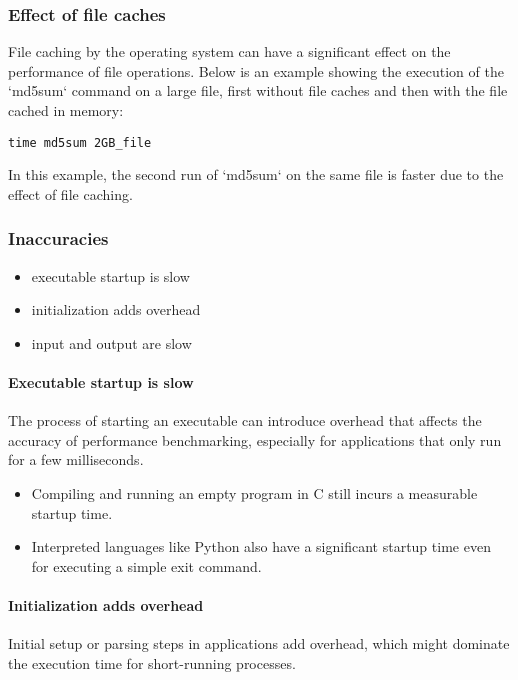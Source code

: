 \documentclass[12pt]{article}
\begin{document}
\subsubsection{Effect of file caches}
File caching by the operating system can have a significant effect on the performance of file operations. Below is an example showing the execution of the `md5sum` command on a large file, first without file caches and then with the file cached in memory:

\begin{lstlisting}
time md5sum 2GB_file
\end{lstlisting}

In this example, the second run of `md5sum` on the same file is faster due to the effect of file caching.

\subsubsection{Inaccuracies}
\begin{itemize}
    \item executable startup is slow
    \item initialization adds overhead
    \item input and output are slow
\end{itemize}

\paragraph{Executable startup is slow}
The process of starting an executable can introduce overhead that affects the accuracy of performance benchmarking, especially for applications that only run for a few milliseconds.

\begin{itemize}
    \item Compiling and running an empty program in C still incurs a measurable startup time.
    \item Interpreted languages like Python also have a significant startup time even for executing a simple exit command.
\end{itemize}


\paragraph{Initialization adds overhead}
Initial setup or parsing steps in applications add overhead, which might dominate the execution time for short-running processes.
\end{document}
